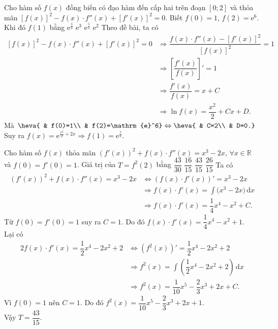 \begin{ex}%
	Cho hàm số $ f(x)$ đồng biến có đạo hàm đến cấp hai trên đoạn $\left[0;2\right]$ và thỏa mãn $\left[f(x)\right]^2-f(x)\cdot f''(x)+\left[f'(x)\right]^2=0$. Biết $ f(0)=1$, $ f(2)={\mathrm{e}}^6$. Khi đó $ f(1)$ bằng
	\choice
	{$\mathrm{e}^{\tfrac{3}{2}}$}
	{$\mathrm{e}^3$}
	{\True $\mathrm{e}^{\tfrac{5}{2}}$}
	{$\mathrm{e}^2$}
	\loigiai
	{
	Theo đề bài, ta có
	\begin{align*}
		\left[f(x)\right]^2-f(x)\cdot f''(x)+\left[f'(x)\right]^2=0
		 & \Rightarrow\dfrac{f(x)\cdot f''(x)-\left[f'(x)\right]^2}{\left[f(x)\right]^2}=1 \\
		 & \Rightarrow{\left[\dfrac{f'(x)}{f(x)}\right]'}=1                                \\& \Rightarrow\dfrac{f'(x)}{f(x)}=x+C\\
		 & \Rightarrow\ln f(x)=\dfrac{x^2}{2}+Cx+D.
	\end{align*}
	Mà $\heva{
			& f(0)=1\\
			& f(2)=\mathrm{e}^6} \Leftrightarrow\heva{
			& C=2\\
			& D=0.}$\\
	Suy ra $f(x)=\mathrm{e}^{\tfrac{x^2}{2}+2x}\Rightarrow f(1)=\mathrm{e}^{\tfrac{5}{2}}$.}
\end{ex}
\begin{ex}%
	Cho hàm số $ f(x)$ thỏa mãn $(f'(x))^2+f(x)\cdot f''(x)=x^3-2x$, $\forall x\in\mathbb{R}$ và $ f(0)=f'(0)=1$. Giá trị của $ T=f^2(2)$ bằng
	\choice
	{$\dfrac{43}{30}$}
	{$\dfrac{16}{15}$}
	{\True $\dfrac{43}{15}$}
	{$\dfrac{26}{15}$}
	\loigiai
	{
		Ta có
		\begin{align*}
			\left( f'(x)\right)^2+f(x)\cdot f''(x)=x^3-2x & \Leftrightarrow \left( f(x)\cdot f'(x)\right)'=x^3-2x \\& \Rightarrow f(x)\cdot f'(x)=\displaystyle\int{(x^3-2x})\mathrm{\,d} x\\&\Rightarrow f(x)\cdot f'(x)=\dfrac{1}{4}{x^4}-x^2+C.
		\end{align*}
		Từ $ f(0)=f'(0)=1$ suy ra $C=1$. Do đó $ f(x)\cdot f'(x)=\dfrac{1}{4}{x^4}-x^2+1$.\\
		Lại có
		\begin{align*}
			2f(x)\cdot f'(x)=\dfrac{1}{2}{x^4}-2x^2+2 & \Leftrightarrow \left( f^2(x)\right) '=\dfrac{1}{2}{x^4}-2x^2+2 \\& \Rightarrow{f^2}(x)=\displaystyle\int{\left(\dfrac{1}{2}{x^4}-2x^2+2\right)}\mathrm{\,d} x\\& \Rightarrow{f^2}(x)=\dfrac{1}{10}{x^5}-\dfrac{2}{3}{x^3}+2x+C.
		\end{align*}
		Vì $ f(0)=1$ nên $C=1$. Do đó $f^2(x)=\dfrac{1}{10}{x^5}-\dfrac{2}{3}{x^3}+2x+1$.\\
		Vậy $T=\dfrac{43}{15}$.}
\end{ex}

